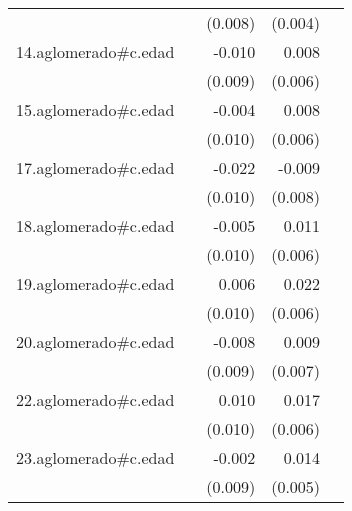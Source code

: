 {\begin{longtable}{l*{4}{D{.}{.}{-1}}}
            &                     &     (0.008)         &     (0.004)         &                     \\
\addlinespace
14.aglomerado#c.edad&                     &      -0.010         &       0.008         &                     \\
            &                     &     (0.009)         &     (0.006)         &                     \\
\addlinespace
15.aglomerado#c.edad&                     &      -0.004         &       0.008         &                     \\
            &                     &     (0.010)         &     (0.006)         &                     \\
\addlinespace
17.aglomerado#c.edad&                     &      -0.022\sym{*}  &      -0.009         &                     \\
            &                     &     (0.010)         &     (0.008)         &                     \\
\addlinespace
18.aglomerado#c.edad&                     &      -0.005         &       0.011         &                     \\
            &                     &     (0.010)         &     (0.006)         &                     \\
\addlinespace
19.aglomerado#c.edad&                     &       0.006         &       0.022\sym{***}&                     \\
            &                     &     (0.010)         &     (0.006)         &                     \\
\addlinespace
20.aglomerado#c.edad&                     &      -0.008         &       0.009         &                     \\
            &                     &     (0.009)         &     (0.007)         &                     \\
\addlinespace
22.aglomerado#c.edad&                     &       0.010         &       0.017\sym{**} &                     \\
            &                     &     (0.010)         &     (0.006)         &                     \\
\addlinespace
23.aglomerado#c.edad&                     &      -0.002         &       0.014\sym{*}  &                     \\
            &                     &     (0.009)         &     (0.005)         &                     \\

\end{longtable}}
